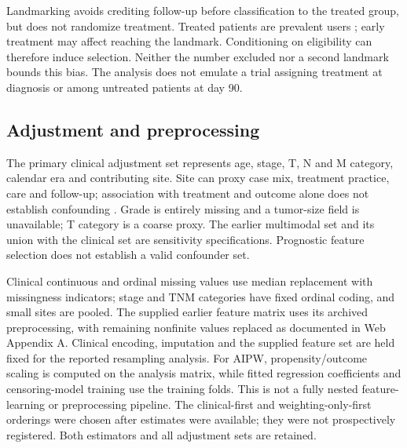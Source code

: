 \documentclass[12pt,letterpaper]{article}
\begin{document}
Landmarking avoids crediting follow-up before classification to the treated group, but does not
randomize treatment. Treated patients are prevalent users \citep{ray}; early treatment may affect
reaching the landmark. Conditioning on eligibility can therefore induce selection.
Neither the number excluded nor a second landmark bounds this bias.
The analysis does not emulate a trial assigning treatment at diagnosis or among untreated patients at day 90.

\subsection{Adjustment and preprocessing}
The primary clinical adjustment set represents age, stage, T, N and M category, calendar era and contributing site.
Site can proxy case mix, treatment practice, care and follow-up; association with treatment and outcome alone
does not establish confounding \citep{vanderweele}. Grade is entirely missing and a tumor-size field
is unavailable; T category is a coarse proxy. The earlier multimodal set and its union with the clinical
set are sensitivity specifications. Prognostic feature selection does not establish a valid confounder set.

Clinical continuous and ordinal missing values use median replacement with missingness indicators;
stage and TNM categories have fixed ordinal coding, and small sites are pooled.
The supplied earlier feature matrix uses its archived preprocessing, with remaining nonfinite values replaced
as documented in Web Appendix A. Clinical encoding, imputation and the supplied feature set are held fixed
for the reported resampling analysis. For AIPW, propensity/outcome scaling is computed on the analysis
matrix, while fitted regression coefficients and censoring-model training use the training folds.
This is not a fully nested feature-learning or preprocessing pipeline.
The clinical-first and weighting-only-first orderings were chosen after estimates were available;
they were not prospectively registered. Both estimators and all adjustment sets are retained.
\end{document}
